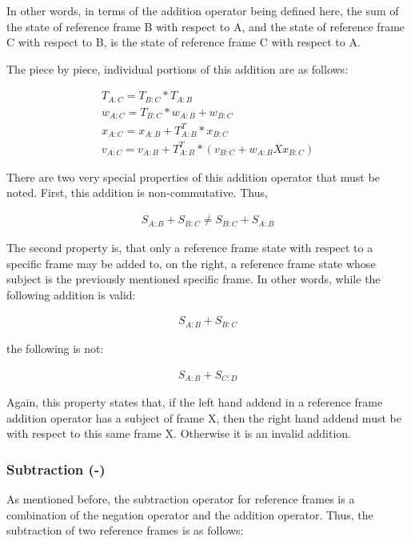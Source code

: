 In other words, in terms of the addition operator being defined
here, the sum of the state of reference frame B with respect to A, and
the state of reference frame C with respect to B, is the state of
reference frame C with respect to A.

The piece by piece, individual portions of this addition are
as follows:

\begin{gather}\label{full_addition}
T_{A:C} = T_{B:C} * T_{A:B}  \\
w_{A:C} = T_{B:C} * w_{A:B} + w_{B:C} \\
x_{A:C} = x_{A:B} + T_{A:B}^T * x_{B:C} \\
v_{A:C} = v_{A:B} + T_{A:B}^T * (v_{B:C} + w_{A:B} X x_{B:C})
\end{gather}

There are two very special properties of this addition operator that
must be noted. First, this addition is non-commutative. Thus,

\begin{gather}\label{non_commutative}
S_{A:B} + S_{B:C} \neq S_{B:C} + S_{A:B}
\end{gather}

The second property is, that only a reference frame state with
respect to a specific frame may be added to, on the right, a reference
frame state whose subject is the previously mentioned specific frame. In
other words,
while the following addition is valid:

\begin{gather}\label{valid_addition}
S_{A:B} + S_{B:C}
\end{gather}

the following is not:

\begin{gather}\label{invalid_addition}
S_{A:B} + S_{C:D}
\end{gather}

Again, this property states that, if the left hand addend in a reference
frame addition operator has a subject of frame X, then the right
hand addend must be with respect to this same frame X. Otherwise
it is an invalid addition.

\subsubsection{Subtraction (-)}

As mentioned before, the subtraction operator for reference frames
is a combination of the negation operator and the addition operator.
Thus, the subtraction of two reference frames is as follows:

